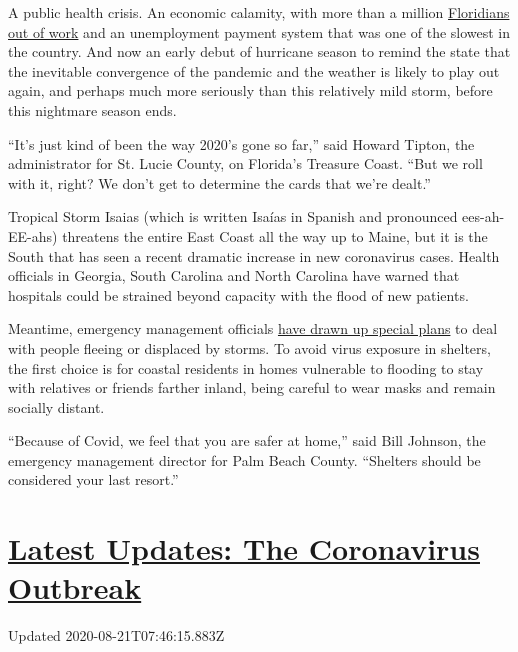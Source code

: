 A public health crisis. An economic calamity, with more than a million
\href{https://www.nytimes3xbfgragh.onion/2020/04/23/us/florida-coronavirus-unemployment.html}{Floridians
out of work} and an unemployment payment system that was one of the
slowest in the country. And now an early debut of hurricane season to
remind the state that the inevitable convergence of the pandemic and the
weather is likely to play out again, and perhaps much more seriously
than this relatively mild storm, before this nightmare season ends.

``It's just kind of been the way 2020's gone so far,'' said Howard
Tipton, the administrator for St. Lucie County, on Florida's Treasure
Coast. ``But we roll with it, right? We don't get to determine the cards
that we're dealt.''

Tropical Storm Isaias (which is written Isaías in Spanish and pronounced
ees-ah-EE-ahs) threatens the entire East Coast all the way up to Maine,
but it is the South that has seen a recent dramatic increase in new
coronavirus cases. Health officials in Georgia, South Carolina and North
Carolina have warned that hospitals could be strained beyond capacity
with the flood of new patients.

Meantime, emergency management officials
\href{https://www.nytimes3xbfgragh.onion/2020/05/24/us/hurricane-pandemic-coronavirus-florida.html}{have
drawn up special plans} to deal with people fleeing or displaced by
storms. To avoid virus exposure in shelters, the first choice is for
coastal residents in homes vulnerable to flooding to stay with relatives
or friends farther inland, being careful to wear masks and remain
socially distant.

``Because of Covid, we feel that you are safer at home,'' said Bill
Johnson, the emergency management director for Palm Beach County.
``Shelters should be considered your last resort.''

\hypertarget{latest-updates-the-coronavirus-outbreak}{%
\section{\texorpdfstring{\href{https://www.nytimes3xbfgragh.onion/2020/08/20/world/coronavirus-covid.html?action=click\&pgtype=Article\&state=default\&region=MAIN_CONTENT_1\&context=storylines_live_updates}{Latest
Updates: The Coronavirus
Outbreak}}{Latest Updates: The Coronavirus Outbreak}}\label{latest-updates-the-coronavirus-outbreak}}

Updated 2020-08-21T07:46:15.883Z

